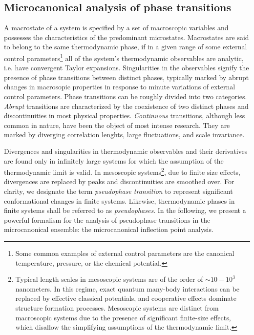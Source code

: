 \documentclass[12pt]{report}
\begin{document}
\subsection{Microcanonical analysis of phase transitions}
\label{subsec: micro_analysis}
A macrostate of a system is specified by a set of macroscopic variables and possesses the characteristics of the predominant microstates. Macrostates are said to belong to the same thermodynamic phase, if in a given range of some external control parameters\footnote{Some common examples of external control parameters are the canonical temperature, pressure, or the chemical potential.} all of the system's thermodynamic observables are analytic, i.e. have convergent Taylor expansions. Singularities in the observables signify the presence of phase transitions between distinct phases, typically marked by abrupt changes in macrosopic properties in response to minute variations of external control parameters. Phase transitions can be roughly divided into two categories. \textit{Abrupt} transitions are characterized by the coexistence of two distinct phases and discontinuities in most physical properties. \textit{Continuous} transitions, although less common in nature, have been the object of most intense research. They are marked by diverging correlation lenghts, large fluctuations, and scale invariance\cite{Sethna2006}. 

Divergences and singularities in thermodynamic observables and their derivatives are found only in infinitely large systems for which the assumption of the thermodynamic limit is valid. In mesoscopic systems\footnote{Typical length scales in  mesoscopic systems are of the order of $\sim 10 - 10^{3}$ nanometers. In this regime, exact quantum many-body interactions can be replaced by effective classical potentials, and cooperative effects dominate structure formation processes. Mesoscopic systems are distinct from macroscopic systems due to the presence of significant finite-size effects, which disallow the simplifying assumptions of the thermodynamic limit.}, due to finite size effects, divergences are replaced by peaks and discontinuities are smoothed over\cite{Bachmann2014}. For clarity, we designate the term \textit{pseudophase transition} to represent significant conformational changes in finite systems. Likewise, thermodynamic phases in finite systems shall be referred to as \textit{pseudophases}. In the following, we present a powerful formalism for the analysis of pseudophase transitions in the microcanonical ensemble: the microcanonical inflection point analysis.
\end{document}
